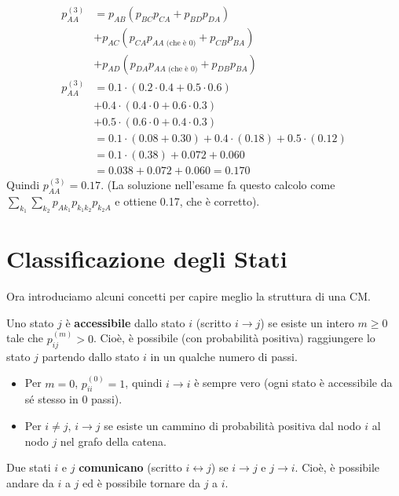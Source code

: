 \begin{exercise}
\begin{align*}
p_{AA}^{(3)} &= p_{AB} (p_{BC}p_{CA} + p_{BD}p_{DA}) \\
           &+ p_{AC} (p_{CA}p_{AA \text{ (che è 0)}} + p_{CB}p_{BA}) \\
           &+ p_{AD} (p_{DA}p_{AA \text{ (che è 0)}} + p_{DB}p_{BA}) \\
p_{AA}^{(3)} &= 0.1 \cdot (0.2 \cdot 0.4 + 0.5 \cdot 0.6) \\ %
           &+ 0.4 \cdot (0.4 \cdot 0 + 0.6 \cdot 0.3) \\ %
           &+ 0.5 \cdot (0.6 \cdot 0 + 0.4 \cdot 0.3) \\ %
           &= 0.1 \cdot (0.08 + 0.30) + 0.4 \cdot (0.18) + 0.5 \cdot (0.12) \\
           &= 0.1 \cdot (0.38) + 0.072 + 0.060 \\
           &= 0.038 + 0.072 + 0.060 = 0.170
\end{align*}
Quindi $p_{AA}^{(3)} = 0.17$.
(La soluzione nell'esame fa questo calcolo come $\sum_{k_1} \sum_{k_2} p_{Ak_1} p_{k_1k_2} p_{k_2A}$ e ottiene 0.17, che è corretto).
\end{exercise}

\section{Classificazione degli Stati}
Ora introduciamo alcuni concetti per capire meglio la struttura di una CM.

\begin{definition}[Accessibilità]
Uno stato $j$ è \textbf{accessibile} dallo stato $i$ (scritto $i \to j$) se esiste un intero $m \ge 0$ tale che $p_{ij}^{(m)} > 0$.
Cioè, è possibile (con probabilità positiva) raggiungere lo stato $j$ partendo dallo stato $i$ in un qualche numero di passi.
\begin{itemize}
    \item Per $m=0$, $p_{ii}^{(0)}=1$, quindi $i \to i$ è sempre vero (ogni stato è accessibile da sé stesso in 0 passi).
    \item Per $i \neq j$, $i \to j$ se esiste un cammino di probabilità positiva dal nodo $i$ al nodo $j$ nel grafo della catena.
\end{itemize}
\end{definition}

\begin{definition}[Comunicazione]
Due stati $i$ e $j$ \textbf{comunicano} (scritto $i \leftrightarrow j$) se $i \to j$ e $j \to i$.
Cioè, è possibile andare da $i$ a $j$ ed è possibile tornare da $j$ a $i$.
\end{definition}

